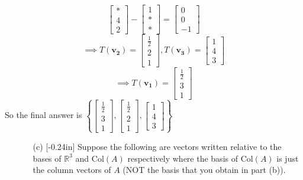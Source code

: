 \documentclass[letterpaper,12pt]{article}
\newcommand{\set}[1]{\left\{ #1 \right\}}
\theoremstyle{definition}
\begin{document}
\begin{enumerate}
\begin{mdframed}
$$\begin{bmatrix}
                * \\ 4 \\ 2
            \end{bmatrix} - \begin{bmatrix}
                1 \\ * \\ *
            \end{bmatrix} = \begin{bmatrix}
                0 \\ 0 \\ -1
            \end{bmatrix}$$
            $$\implies T(\mathbf{v_2}) = \begin{bmatrix}
                \frac{1}{2} \\ 2 \\ 1
            \end{bmatrix}, T(\mathbf{v_3}) = \begin{bmatrix}
                1 \\ 4 \\ 3
            \end{bmatrix}$$
            $$\implies T(\mathbf{v_1}) =\begin{bmatrix}
                \frac{1}{2} \\ 3 \\ 1
            \end{bmatrix} $$
            So the final answer is 
            $\set{\begin{bmatrix}
                \frac{1}{2} \\ 3 \\ 1
            \end{bmatrix},\begin{bmatrix}
                \frac{1}{2} \\ 2 \\ 1
            \end{bmatrix},\begin{bmatrix}
              1 \\ 4  \\ 3
            \end{bmatrix}}$
    \end{mdframed}
\end{enumerate}
\pagebreak
\begin{enumerate}
    \item[] \begin{enumerate}
        \item[(c)] \reversemarginpar{}[-0.24in]  Suppose the following are vectors written relative to the bases of $\mathbb{R}^3$ and $\mathrm{Col}(A)$ respectively where the basis of $\mathrm{Col}(A)$ is just the column vectors of $A$ (NOT the basis that you obtain in part (b)).
    \end{enumerate}
\end{enumerate}
\end{document}
